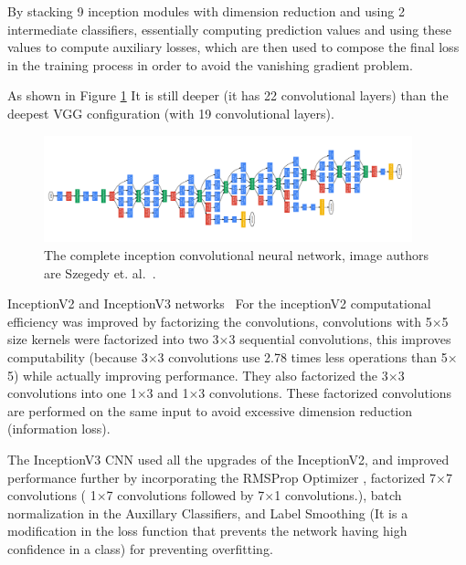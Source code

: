 By stacking 9 inception modules with dimension reduction and using 2 intermediate classifiers, essentially computing prediction values and using these values to compute auxiliary losses, which are then used to compose the final loss in the training process in order to avoid the vanishing gradient problem.

As shown in Figure \ref{fig:inception-architecture} It is still deeper (it has 22 convolutional layers) than the deepest VGG configuration (with 19 convolutional layers).

\begin{figure}[!ht]
    \centering
    \includegraphics[width=0.95\textwidth]{img/inception-architecture.png}
    \caption{The complete inception convolutional neural network, image authors are Szegedy et. al.~\cite{szegedy2015Inception}.}
    \label{fig:inception-architecture}
\end{figure}

InceptionV2 and InceptionV3 networks~\cite{szegedy2016rethinking}
For the inceptionV2 computational efficiency was improved by factorizing the convolutions, convolutions with 5$\times$5 size kernels were factorized into two 3$\times$3 sequential convolutions, this improves computability (because 3$\times$3 convolutions use 2.78 times less operations than 5$\times$5) while actually improving performance. They also factorized the 3$\times$3 convolutions into one 1$\times$3 and 1$\times$3 convolutions. These factorized convolutions are performed on the same input to avoid excessive dimension reduction (information loss).

The InceptionV3 CNN used all the upgrades of the InceptionV2, and improved performance further by incorporating the RMSProp Optimizer \cite{tieleman2017rmsprop}, factorized 7$\times$7 convolutions ( 1$\times$7 convolutions followed
by 7$\times$1 convolutions.), batch normalization in the Auxillary Classifiers, and Label Smoothing (It is a modification in the loss function that prevents the network having high confidence in a class) for preventing overfitting.



